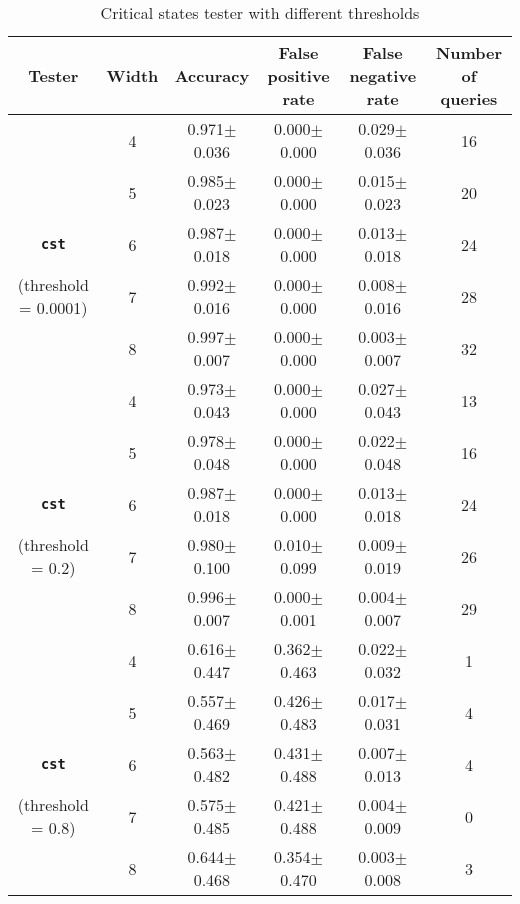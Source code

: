 \begin{table}[h]
    
    \caption{Critical states tester with different thresholds}
  \label{tab:cst_thresholds}
  \centering
  \begin{tabular}{cccccc}
  \\
    \toprule
    \textbf{Tester}     & \textbf{Width}    & \textbf{Accuracy} & \textbf{False positive rate} & \textbf{False negative rate} & \textbf{Number of queries} \\
    \midrule
     & 4 & 0.971$\pm$	0.036&	0.000$\pm$	0.000&	0.029$\pm$	0.036&	16\\
      & 5 & 0.985$\pm$	0.023&	0.000$\pm$	0.000&	0.015$\pm$	0.023&	20\\
     \textbf{\texttt{cst}}& 6 & 0.987$\pm$	0.018&	0.000$\pm$	0.000&	0.013$\pm$	0.018&	24\\
     (threshold = 0.0001)& 7 & 0.992$\pm$	0.016&	0.000$\pm$	0.000&	0.008$\pm$	0.016&	28\\
     & 8 & 0.997$\pm$	0.007&	0.000$\pm$	0.000&	0.003$\pm$	0.007&	32\\
     \midrule
      & 4 & 0.973$\pm$	0.043&	0.000$\pm$	0.000&	0.027$\pm$	0.043&	13\\
      & 5 & 0.978$\pm$	0.048&	0.000$\pm$	0.000&	0.022$\pm$	0.048&	16\\
     \textbf{\texttt{cst}}& 6 & 0.987$\pm$	0.018&	0.000$\pm$	0.000&	0.013$\pm$	0.018&	24\\
     (threshold = 0.2)& 7 & 0.980$\pm$	0.100&	0.010$\pm$	0.099&	0.009$\pm$	0.019&	26\\
     & 8 & 0.996$\pm$	0.007&	0.000$\pm$	0.001&	0.004$\pm$	0.007&	29\\
     \midrule
      & 4 & 0.616$\pm$	0.447&	0.362$\pm$	0.463&	0.022$\pm$	0.032&	1\\
      & 5 & 0.557$\pm$	0.469&	0.426$\pm$	0.483&	0.017$\pm$	0.031&	4\\
     \textbf{\texttt{cst}}& 6 & 0.563$\pm$	0.482&	0.431$\pm$	0.488&	0.007$\pm$	0.013&	4\\
     (threshold = 0.8)& 7 & 0.575$\pm$	0.485&	0.421$\pm$	0.488&	0.004$\pm$	0.009&	0\\
     & 8 & 0.644$\pm$	0.468&	0.354$\pm$	0.470&	0.003$\pm$	0.008&	3\\

\bottomrule
    \end{tabular}
\end{table}

